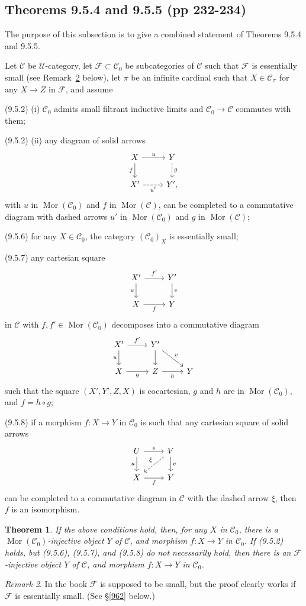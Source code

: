 \documentclass[12pt]{article}%
\newtheorem{thm}{Theorem}%
\theoremstyle{remark}
\newtheorem{rk}[thm]{Remark}
\theoremstyle{definition}
\newcommand{\nn}{\noindent}
\newcommand{\cc}{\mathcal}
\newcommand{\C}{\mathcal C}
\newcommand{\F}{\mathcal F}
\newcommand{\U}{\mathcal U}
\DeclareMathOperator{\Mor}{Mor}
\begin{document}

\subsection{Theorems 9.5.4 and 9.5.5 (pp 232-234)}\label{954955}

The purpose of this subsection is to give a combined statement of Theorems 9.5.4 and 9.5.5. 

Let $\C$ be $\U$-category, let $\cc F\subset\C_0$ be subcategories of $\C$ such that $\cc F$ is essentially small (see Remark~\ref{954} below), let $\pi$ be an infinite cardinal such that $X\in\C_\pi$ for any $X\to Z$ in $\cc F$, and assume 

\nn(9.5.2) (i) $\C_0$ admits small filtrant inductive limits and $\C_0\to\C$ commutes with them;

\nn(9.5.2) (ii) any diagram of solid arrows
$$
\begin{tikzcd}
X\ar{d}[swap]{f}\ar{r}{u}&Y\ar[dashed]{d}{g}\\ 
X'\ar[dashed]{r}[swap]{u'}&Y',
\end{tikzcd}
$$ 
with $u$ in $\Mor(\C_0)$ and $f$ in $\Mor(\C)$, can be completed to a commutative diagram with dashed arrows $u'$ in $\Mor(\C_0)$ and $g$ in $\Mor(\C)$; 

\nn(9.5.6) for any $X\in\C_0$, the category $(\C_0)_X$ is essentially small;

\nn(9.5.7) any cartesian square 
$$
\begin{tikzcd}
X'\ar{d}[swap]{u}\ar{r}{f'}&Y'\ar{d}{v}\\ 
X\ar{r}[swap]{f}&Y
\end{tikzcd}
$$ 
in $\C$ with $f,f'\in\Mor(\C_0)$ decomposes into a commutative diagram 
$$
\begin{tikzcd}
X'\ar{d}[swap]{u}\ar{r}{f'}&Y'\ar{d}\ar{rd}{v}\\ 
X\ar{r}[swap]{g}&Z\ar{r}[swap]{h}&Y
\end{tikzcd}
$$ 
such that the square $(X',Y',Z,X)$ is cocartesian, $g$ and $h$ are in $\Mor(\C_0)$, and $f=h\circ g$; 

\nn(9.5.8) if a morphism $f:X\to Y$ in $\C_0$ is such that any cartesian square of solid arrows
$$
\begin{tikzcd}
U\ar{d}[swap]{u}\ar{r}{s}&V\ar{d}{v}\ar[dashed]{ld}[swap]{\xi}\\ 
X\ar{r}[swap]{f}&Y
\end{tikzcd}
$$ 
can be completed to a commutative diagram in $\C$ with the dashed arrow $\xi$, then $f$ is an isomorphism. 
%
\begin{thm}%
If the above conditions hold, then, for any $X$ in $\C_0$, there is a $\Mor(\C_0)$-injective object $Y$ of $\C$, and morphism $f:X\to Y$ in $\C_0$. If (9.5.2) holds, but (9.5.6), (9.5.7), and (9.5.8) do not necessarily hold, then there is an $\F$-injective object $Y$ of $\C$, and morphism $f:X\to Y$ in $\C_0$.
\end{thm}
%
\begin{rk}\label{954}
In the book $\cc F$ is supposed to be small, but the proof clearly works if $\cc F$ is essentially small. (See \S\ref{962} below.)
\end{rk}
\end{document}
